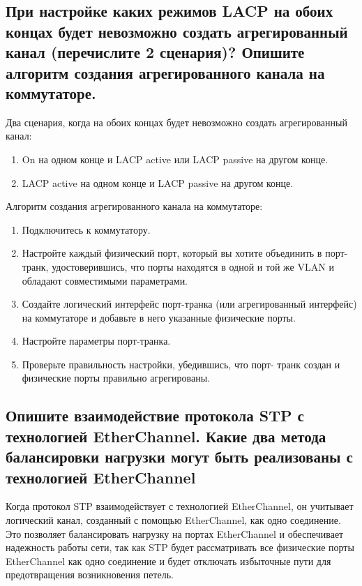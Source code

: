 \subsection{При настройке каких режимов LACP на обоих концах будет
невозможно создать агрегированный канал (перечислите 2
сценария)? Опишите алгоритм создания агрегированного
канала на коммутаторе.}

Два сценария, когда на обоих концах будет невозможно создать
агрегированный канал:

\begin{enumerate}
    \item On на одном конце и LACP active или LACP passive на другом
    конце.
    \item LACP active на одном конце и LACP passive на другом конце.
\end{enumerate}

Алгоритм создания агрегированного канала на коммутаторе:

\begin{enumerate}
    \item Подключитесь к коммутатору.
    \item Настройте каждый физический порт, который вы хотите
    объединить в порт-транк, удостоверившись, что порты находятся в
    одной и той же VLAN и обладают совместимыми параметрами.
    \item Создайте логический интерфейс порт-транка (или
    агрегированный интерфейс) на коммутаторе и добавьте в него
    указанные физические порты.
    \item Настройте параметры порт-транка.
    \item Проверьте правильность настройки, убедившись, что порт-
    транк создан и физические порты правильно агрегированы.
\end{enumerate}


\subsection{Опишите взаимодействие протокола STP с технологией
EtherChannel. Какие два метода балансировки нагрузки могут
быть реализованы с технологией EtherChannel}

Когда протокол STP взаимодействует с технологией EtherChannel, он
учитывает логический канал, созданный с помощью EtherChannel, как одно
соединение. Это позволяет балансировать нагрузку на портах EtherChannel и
обеспечивает надежность работы сети, так как STP будет рассматривать все
физические порты EtherChannel как одно соединение и будет отключать
избыточные пути для предотвращения возникновения петель.

